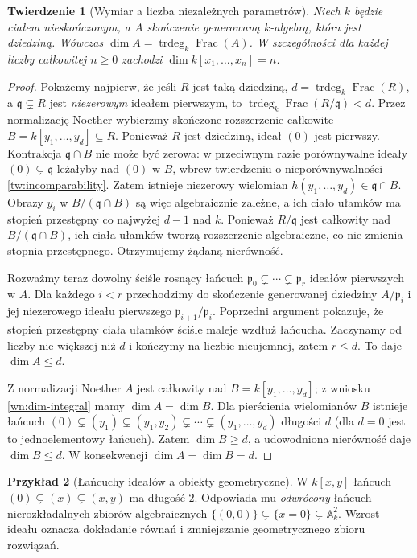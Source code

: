\documentclass[11pt,a4paper,openany]{report}
\numberwithin{equation}{section}
\theoremstyle{plain}
\newtheorem{twierdzenie}{Twierdzenie}[section]
\theoremstyle{definition}
\newtheorem{przyklad}[twierdzenie]{Przykład}
\theoremstyle{remark}
\newcommand{\A}{\mathbb A}
\begin{document}
\begin{twierdzenie}[Wymiar a liczba niezależnych parametrów]
\label{tw:dim-trdeg}
Niech $k$ będzie ciałem nieskończonym, a $A$
skończenie generowaną $k$-algebrą, która jest dziedziną.
Wówczas
$\dim A=\operatorname{trdeg}_k\operatorname{Frac}(A)$.
W szczególności dla każdej liczby całkowitej $n\ge0$
zachodzi $\dim k[x_1,\ldots,x_n]=n$.
\end{twierdzenie}
\begin{proof}
Pokażemy najpierw, że jeśli $R$ jest taką dziedziną,
$d=\operatorname{trdeg}_k\operatorname{Frac}(R)$,
a $\mathfrak q\subsetneq R$ jest \emph{niezerowym}
ideałem pierwszym, to
$\operatorname{trdeg}_k\operatorname{Frac}(R/\mathfrak q)<d$.
Przez normalizację Noether wybierzmy skończone
rozszerzenie całkowite
$B=k[y_1,\ldots,y_d]\subseteq R$.
Ponieważ $R$ jest dziedziną, ideał $(0)$ jest
pierwszy. Kontrakcja $\mathfrak q\cap B$ nie może
być zerowa: w przeciwnym razie porównywalne ideały
$(0)\subsetneq\mathfrak q$ leżałyby nad $(0)$ w $B$,
wbrew twierdzeniu o nieporównywalności
\ref{tw:incomparability}.
Zatem istnieje niezerowy wielomian
$h(y_1,\ldots,y_d)\in\mathfrak q\cap B$.
Obrazy $y_i$ w $B/(\mathfrak q\cap B)$ są więc
algebraicznie zależne, a ich ciało ułamków ma
stopień przestępny co najwyżej $d-1$ nad $k$.
Ponieważ $R/\mathfrak q$ jest całkowity nad
$B/(\mathfrak q\cap B)$, ich ciała ułamków tworzą
rozszerzenie algebraiczne, co nie zmienia stopnia
przestępnego. Otrzymujemy żądaną nierówność.

Rozważmy teraz dowolny ściśle rosnący łańcuch
$\mathfrak p_0\subsetneq\cdots\subsetneq
\mathfrak p_r$ ideałów pierwszych w $A$.
Dla każdego $i<r$ przechodzimy do skończenie
generowanej dziedziny $A/\mathfrak p_i$ i jej
niezerowego ideału pierwszego
$\mathfrak p_{i+1}/\mathfrak p_i$. Poprzedni
argument pokazuje, że stopień przestępny ciała
ułamków ściśle maleje wzdłuż łańcucha.
Zaczynamy od liczby nie większej niż $d$ i kończymy
na liczbie nieujemnej, zatem $r\le d$.
To daje $\dim A\le d$.

Z normalizacji Noether $A$ jest całkowity nad
$B=k[y_1,\ldots,y_d]$; z wniosku
\ref{wn:dim-integral} mamy $\dim A=\dim B$.
Dla pierścienia wielomianów $B$ istnieje łańcuch
$(0)\subsetneq(y_1)\subsetneq(y_1,y_2)
\subsetneq\cdots\subsetneq(y_1,\ldots,y_d)$
długości $d$ (dla $d=0$ jest to jednoelementowy
łańcuch). Zatem $\dim B\ge d$, a udowodniona
nierówność daje $\dim B\le d$. W konsekwencji
$\dim A=\dim B=d$.
\end{proof}

\begin{przyklad}[Łańcuchy ideałów a obiekty geometryczne]
W $k[x,y]$ łańcuch
$(0)\subsetneq(x)\subsetneq(x,y)$
ma długość $2$. Odpowiada mu \emph{odwrócony}
łańcuch nierozkładalnych zbiorów algebraicznych
$\{(0,0)\}\subsetneq\{x=0\}\subsetneq\A^2_k$.
Wzrost ideału oznacza dokładanie równań i
zmniejszanie geometrycznego zbioru rozwiązań.
\end{przyklad}
\end{document}
